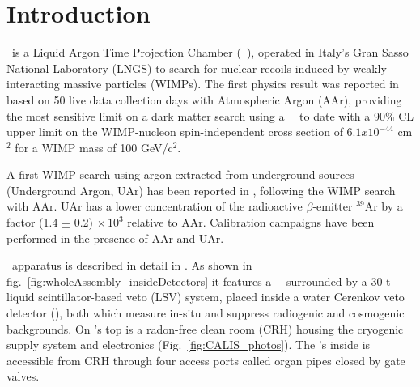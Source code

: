 \section{Introduction}\label{sec:intro}\label{sec:introduction}

\dsf\ is a Liquid Argon Time Projection Chamber (\lar\ \tpc), operated in Italy's Gran Sasso National Laboratory (LNGS) to search for nuclear recoils induced by weakly interacting massive particles (WIMPs). The first physics result was reported in \cite{Agnes:2015gu} based on 50 live data collection days with Atmospheric Argon (AAr), providing the most sensitive limit on a dark matter search using a \lar\ \tpc\ to date with a 90\% CL upper limit on the WIMP-nucleon spin-independent cross section of $6.1 x 10^{-44}$ cm$^2$ for a WIMP mass of 100 GeV/c$^2$.  %

A first WIMP search using argon extracted from underground sources (Underground Argon, UAr) has been reported in \cite{Agnes:2015_uar}, following the WIMP search with AAr. UAr has a lower concentration of the radioactive $\beta$-emitter $^{39}$Ar by a factor (1.4 $\pm$ 0.2) $\times\, 10^3$ relative to AAr. Calibration campaigns have been performed in the presence of AAr and UAr.

\dsf\ apparatus is described in detail in \cite{Agnes:2015gu}. As shown in fig.~\ref{fig:wholeAssembly_insideDetectors} it features a \lar\ \tpc\ surrounded by a 30 t liquid scintillator-based veto (LSV) system, placed inside a water Cerenkov veto detector (\wcv), both which measure in-situ and suppress radiogenic and cosmogenic backgrounds. On \wcv's top is a radon-free clean room (CRH) housing the cryogenic supply system and electronics (Fig.~\ref{fig:CALIS_photos}). The \lsv's inside is accessible from CRH through four access ports called organ pipes closed by gate valves. 


